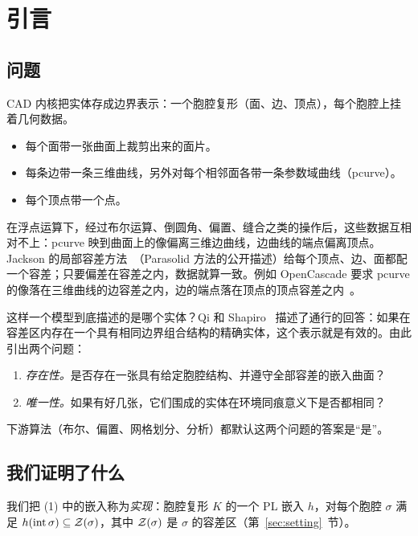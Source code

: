 \section{引言}\label{sec:intro}

\subsection{问题}
CAD 内核把实体存成边界表示：一个胞腔复形（面、边、顶点），每个胞腔上挂着几何数据。
\begin{itemize}
\item 每个面带一张曲面上裁剪出来的面片。
\item 每条边带一条三维曲线，另外对每个相邻面各带一条参数域曲线（pcurve）。
\item 每个顶点带一个点。
\end{itemize}
在浮点运算下，经过布尔运算、倒圆角、偏置、缝合之类的操作后，这些数据互相对不上：pcurve 映到曲面上的像偏离三维边曲线，边曲线的端点偏离顶点。Jackson 的局部容差方法~\cite{Jackson95}（Parasolid 方法的公开描述）给每个顶点、边、面都配一个容差；只要偏差在容差之内，数据就算一致。例如 OpenCascade 要求 pcurve 的像落在三维曲线的边容差之内，边的端点落在顶点的顶点容差之内~\cite{OCCT}。

这样一个模型到底描述的是哪个实体？Qi 和 Shapiro~\cite{QiShapiro06b} 描述了通行的回答：如果在容差区内存在一个具有相同边界组合结构的精确实体，这个表示就是有效的。由此引出两个问题：
\begin{enumerate}
\item \emph{存在性。}是否存在一张具有给定胞腔结构、并遵守全部容差的嵌入曲面？
\item \emph{唯一性。}如果有好几张，它们围成的实体在环境同痕意义下是否都相同？
\end{enumerate}
下游算法（布尔、偏置、网格划分、分析）都默认这两个问题的答案是``是''。

\subsection{我们证明了什么}
我们把 (1) 中的嵌入称为\emph{实现}：胞腔复形 $K$ 的一个 PL 嵌入 $h$，对每个胞腔 $\sigma$ 满足 $h(\operatorname{int}\sigma)\subseteq\mathcal{Z}(\sigma)$，其中 $\mathcal{Z}(\sigma)$ 是 $\sigma$ 的容差区（第~\ref{sec:setting}~节）。

